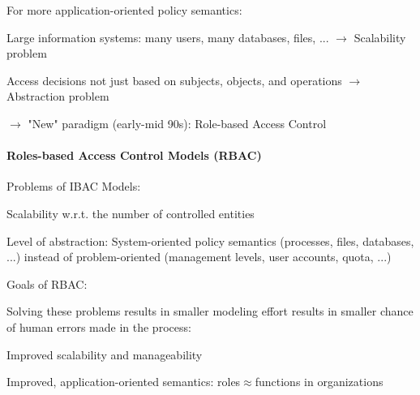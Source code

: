 \documentclass[a4paper]{article}
\begin{document}
\begin{multicols}{3}
\begin{itemize*}
\begin{itemize*}
                  \item For more application-oriented policy semantics:
                        \begin{itemize*}
                            \item Large information systems: many users, many databases, files, ... $\rightarrow$ Scalability problem
                            \item Access decisions not just based on subjects, objects, and operations $\rightarrow$ Abstraction problem
                        \end{itemize*}
              \end{itemize*}
    \end{itemize*}

    $\rightarrow$ "New" paradigm (early-mid 90s): Role-based Access Control

    \paragraph{Roles-based Access Control Models (RBAC)}

    Problems of IBAC Models:
    \begin{itemize*}
        \item Scalability w.r.t. the number of controlled entities
        \item Level of abstraction: System-oriented policy semantics (processes, files, databases, ...) instead of problem-oriented (management levels, user accounts, quota, ...)
    \end{itemize*}

    Goals of RBAC:
    \begin{itemize*}
        \item Solving these problems results in smaller modeling effort results in smaller chance of human errors made in the process:
              \begin{itemize*}
                  \item Improved scalability and manageability
                  \item Improved, application-oriented semantics: roles$\approx$functions in organizations
              \end{itemize*}
    \end{itemize*}


\end{multicols}
\end{document}
